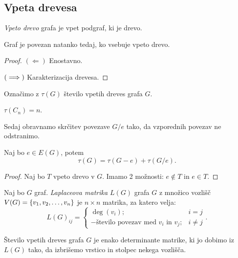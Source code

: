 \subsection{Vpeta drevesa}
\begin{definicija}
    \emph{Vpeto drevo} grafa je vpet podgraf, ki je drevo.
\end{definicija}

\begin{trditev}
    Graf je povezan natanko tedaj, ko vsebuje vpeto drevo.
\end{trditev}

\begin{proof}
    $(\Leftarrow)$ Enostavno.

    $(\implies)$ Karakterizacija drevesa.
\end{proof}

Označimo z $\tau(G)$ število vpetih dreves grafa $G$.
\begin{primer}
    $\tau(C_n) = n$.
\end{primer}

\begin{opomba}
    Sedaj obravnamo skrčitev povezave $G/e$ tako, da vzporednih povezav ne odstranimo.
\end{opomba}

\begin{trditev}
    Naj bo $e \in E(G)$, potem $$\tau(G) = \tau(G-e) + \tau (G/e).$$
\end{trditev}

\begin{proof}
    Naj bo $T$ vpeto drevo v $G$. Imamo 2 možnosti: $e \notin T$ in $e \in T$.
\end{proof}

\begin{definicija}
    Naj bo $G$ graf. \emph{Laplaceova matrika $L(G)$} grafa $G$ z množico vozlišč $V(G) = \left\{v_1, v_2, \ldots, v_n\right\}$ je $n \times n$ matrika, za katero velja: $$L(G)_{ij} = \begin{cases}
        \deg(v_i); &i=j \\ - \text{število povezav med $v_i$ in $v_j$}; &i \neq j
    \end{cases}.$$
\end{definicija}

\begin{izrek}
    Število vpetih dreves grafa $G$ je enako determinante matrike, ki jo dobimo iz $L(G)$ tako, da izbrišemo vrstico in stolpec nekega vozlišča.
\end{izrek}

